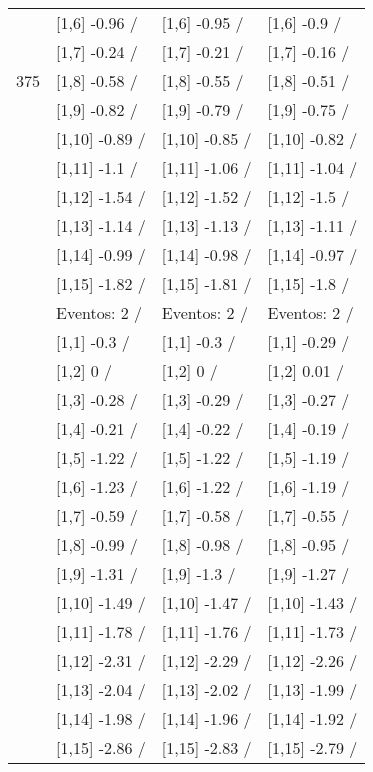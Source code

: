 \begin{table}
\begin{tabular}[t]{llll}
 & {}[1,6] -0.96  / & {}[1,6] -0.95  / & {}[1,6] -0.9  /\\
 & {}[1,7] -0.24  / & {}[1,7] -0.21  / & {}[1,7] -0.16  /\\
375 & {}[1,8] -0.58  / & {}[1,8] -0.55  / & {}[1,8] -0.51  /\\
\addlinespace
 & {}[1,9] -0.82  / & {}[1,9] -0.79  / & {}[1,9] -0.75  /\\
 & {}[1,10] -0.89  / & {}[1,10] -0.85  / & {}[1,10] -0.82  /\\
 & {}[1,11] -1.1  / & {}[1,11] -1.06  / & {}[1,11] -1.04  /\\
 & {}[1,12] -1.54  / & {}[1,12] -1.52  / & {}[1,12] -1.5  /\\
 & {}[1,13] -1.14  / & {}[1,13] -1.13  / & {}[1,13] -1.11  /\\
\addlinespace
 & {}[1,14] -0.99  / & {}[1,14] -0.98  / & {}[1,14] -0.97  /\\
 & {}[1,15] -1.82  / & {}[1,15] -1.81  / & {}[1,15] -1.8  /\\
 & Eventos:  2 / & Eventos:  2 / & Eventos:  2 /\\
 & {}[1,1] -0.3  / & {}[1,1] -0.3  / & {}[1,1] -0.29  /\\
 & {}[1,2] 0  / & {}[1,2] 0  / & {}[1,2] 0.01  /\\
\addlinespace
 & {}[1,3] -0.28  / & {}[1,3] -0.29  / & {}[1,3] -0.27  /\\
 & {}[1,4] -0.21  / & {}[1,4] -0.22  / & {}[1,4] -0.19  /\\
 & {}[1,5] -1.22  / & {}[1,5] -1.22  / & {}[1,5] -1.19  /\\
 & {}[1,6] -1.23  / & {}[1,6] -1.22  / & {}[1,6] -1.19  /\\
 & {}[1,7] -0.59  / & {}[1,7] -0.58  / & {}[1,7] -0.55  /\\
\addlinespace
500 & {}[1,8] -0.99  / & {}[1,8] -0.98  / & {}[1,8] -0.95  /\\
 & {}[1,9] -1.31  / & {}[1,9] -1.3  / & {}[1,9] -1.27  /\\
 & {}[1,10] -1.49  / & {}[1,10] -1.47  / & {}[1,10] -1.43  /\\
 & {}[1,11] -1.78  / & {}[1,11] -1.76  / & {}[1,11] -1.73  /\\
 & {}[1,12] -2.31  / & {}[1,12] -2.29  / & {}[1,12] -2.26  /\\
\addlinespace
 & {}[1,13] -2.04  / & {}[1,13] -2.02  / & {}[1,13] -1.99  /\\
 & {}[1,14] -1.98  / & {}[1,14] -1.96  / & {}[1,14] -1.92  /\\
 & {}[1,15] -2.86  / & {}[1,15] -2.83  / & {}[1,15] -2.79  /\\
\bottomrule
\end{tabular}
\end{table}
